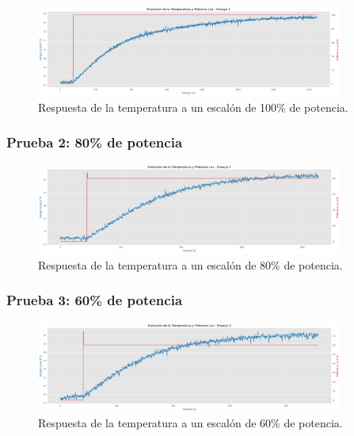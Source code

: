 \documentclass[spanish, a4paper, 11pt]{article}
\begin{document}
\begin{figure}[ht]
    \centering
    \includegraphics[width=0.9\textwidth]{./figures/prueba1.png}
    \caption{Respuesta de la temperatura a un escalón de 100\% de potencia.}
\end{figure}
\FloatBarrier

\subsubsection{Prueba 2: 80\% de potencia}

\begin{figure}[ht]
    \centering
    \includegraphics[width=0.9\textwidth]{./figures/prueba2.png}
    \caption{Respuesta de la temperatura a un escalón de 80\% de potencia.}
\end{figure}
\FloatBarrier

\subsubsection{Prueba 3: 60\% de potencia}

\begin{figure}[ht]
    \centering
    \includegraphics[width=0.9\textwidth]{./figures/prueba3.png}
    \caption{Respuesta de la temperatura a un escalón de 60\% de potencia.}
\end{figure}
\FloatBarrier
\end{document}
